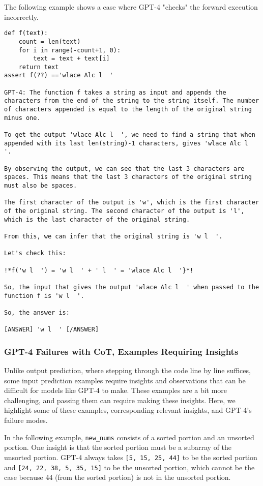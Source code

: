 The following example shows a case where GPT-4 "checks" the forward execution incorrectly.
\begin{lstlisting}
def f(text):
    count = len(text)
    for i in range(-count+1, 0):
        text = text + text[i]
    return text
assert f(??) =='wlace Alc l  '

GPT-4: The function f takes a string as input and appends the characters from the end of the string to the string itself. The number of characters appended is equal to the length of the original string minus one. 

To get the output 'wlace Alc l  ', we need to find a string that when appended with its last len(string)-1 characters, gives 'wlace Alc l  '. 

By observing the output, we can see that the last 3 characters are spaces. This means that the last 3 characters of the original string must also be spaces. 

The first character of the output is 'w', which is the first character of the original string. The second character of the output is 'l', which is the last character of the original string. 

From this, we can infer that the original string is 'w l  '. 

Let's check this:

!*f('w l  ') = 'w l  ' + ' l  ' = 'wlace Alc l  '}*!

So, the input that gives the output 'wlace Alc l  ' when passed to the function f is 'w l  '. 

So, the answer is:

[ANSWER] 'w l  ' [/ANSWER]
\end{lstlisting}

\subsubsection{GPT-4 Failures with CoT, Examples Requiring Insights}
Unlike output prediction, where stepping through the code line by line suffices, some input prediction examples require insights and observations that can be difficult for models like GPT-4 to make. These examples are a bit more challenging, and passing them can require making these insights. Here, we highlight some of these examples, corresponding relevant insights, and GPT-4's failure modes.

In the following example, \texttt{new\_nums} consists of a sorted portion and an unsorted portion. One insight is that the sorted portion must be a subarray of the unsorted portion. GPT-4 always takes \texttt{[5, 15, 25, 44]} to be the sorted portion and \texttt{[24, 22, 38, 5, 35, 15]} to be the unsorted portion, which cannot be the case because 44 (from the sorted portion) is not in the unsorted portion.

